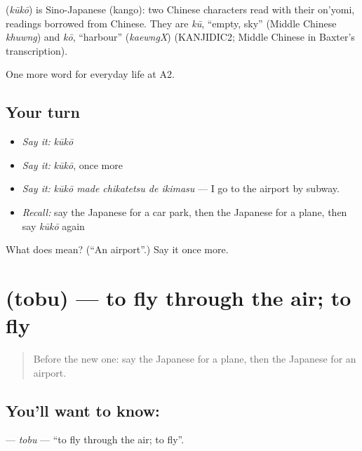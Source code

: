\begin{cousinweb}
\textbf{} (\emph{kūkō}) is Sino-Japanese (kango): two Chinese characters read with their on'yomi, readings borrowed from Chinese. They are \emph{kū}, \textquotedblleft{}empty, sky\textquotedblright{} (Middle Chinese \emph{khuwng}) and \emph{kō}, \textquotedblleft{}harbour\textquotedblright{} (\emph{kaewngX}) (KANJIDIC2; Middle Chinese in Baxter's transcription).
\end{cousinweb}

\begin{grammarlens}[title={What you've built}]
One more word for everyday life at A2.
\end{grammarlens}

\subsection*{Your turn}
\begin{itemize}
\raggedright
  \item \emph{Say it:} \emph{kūkō}
  \item \emph{Say it:} \emph{kūkō}, once more
  \item \emph{Say it:} \emph{kūkō made chikatetsu de ikimasu} — I go to the airport by subway.
  \item \emph{Recall:} say the Japanese for a car park, then the Japanese for a plane, then say \emph{kūkō} again
\end{itemize}

\begin{tcolorbox}[breakable,colback=teal!4,colframe=teal!35!black,title={Before you move on}]
What does  mean? (\textquotedblleft{}An airport\textquotedblright{}.) Say it once more.
\end{tcolorbox}
\section[\texorpdfstring{\ja{とぶ} (tobu)}{とぶ (tobu)}]{ (tobu) — to fly through the air; to fly}

\label{lesson:JA-C203-tobu}



\begin{quote}
Before the new one: say the Japanese for a plane, then the Japanese for an airport.
\end{quote}

\subsection*{You'll want to know: }
\textbf{} — \emph{tobu} — \textquotedblleft{}to fly through the air; to fly\textquotedblright{}.

